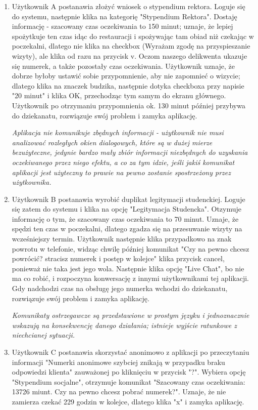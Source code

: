 \documentclass[12pt]{article}
\begin{document}
\begin {enumerate}
	\item Użytkownik A postanawia złożyć wniosek o stypendium rektora. Loguje się do systemu, następnie klika na kategorię "Stypendium Rektora". Dostaję informację - szacowany czas oczekiwania to 150 minut; uznaje, że lepiej spożytkuje ten czas idąc do restauracji i spożywając tam obiad niż czekając w poczekalni, dlatego nie klika na checkbox (Wyrażam zgodę na przyspieszanie wizyty), ale klika od razu na przycisk v. Oczom naszego delikwenta ukazuje się numerek, a także pozostały czas oczekiwania. Użytkownik uznaje, że dobrze byłoby ustawić sobie przypomnienie, aby nie zapomnieć o wizycie; dlatego klika na znaczek budzika, następnie dotyka checkboxa przy napisie "20 minut" i klika OK, przechodząc tym samym do ekranu głównego. Użytkownik po otrzymaniu przypomnienia ok. 130 minut później przybywa do dziekanatu, rozwiązuje swój problem i zamyka aplikację.
	
	\textit{Aplikacja nie komunikuje zbędnych informacji - użytkownik nie musi analizować rozległych okien dialogowych, które są w dużej mierze bezużyteczne, jedynie bardzo mały zbiór informacji niezbędnych do uzyskania oczekiwanego przez niego efektu, a co za tym idzie, jeśli jakiś komunikat aplikacji jest użyteczny to prawie na pewno zostanie spostrzeżony przez użytkownika.}\\
	
	
	\item Użytkownik B postanawia wyrobić duplikat legitymacji studenckiej. Loguje się zatem do systemu i klika na opcję "Legitymacja Studencka". Otzymuje informację o tym, że szacowany czas oczekiwania to 70 minut. Uznaje, że spędzi ten czas w poczekalni, dlatego zgadza się na przesuwanie wizyty na wcześniejszy termin. Użytkownik następnie klika przypadkowo na znak powrotu w telefonie, widząc chwilę później komunikat "Czy na pewno chcesz powrócić? stracisz numerek i postęp w kolejce" klika przycisk cancel, ponieważ nie taka jest jego wola. Następnie klika opcję "Live Chat", bo nie ma co robić, i rozpoczyna konwersację z innymi użytkownikami tej aplikacji. Gdy nadchodzi czas na obsługę jego numerka wchodzi do dziekanatu, rozwiązuje swój problem i zamyka aplikację.
	
	\textit{Komunikaty ostrzegawcze są przedstawione w prostym języku i jednoznacznie wskazują na konsekwencję danego działania; istnieje wyjście ratunkowe z niechcianej sytuacji.}\\
	
	\item Użytkownik C postanawia skorzystać anonimowo z aplikacji po przeczytaniu informacji "Numerki anonimowe szybciej znikają w przypadku braku odpowiedzi klienta" zauważonej po kliknięciu w przycisk "?". Wybiera opcję "Stypendium socjalne", otrzymuje komunikat "Szacowany czas oczekiwania: 13726 miunt. Czy na pewno chcesz pobrać numerek?". Uznaje, że nie zamierza czekać 229 godzin w kolejce, dlatego klika "x" i zamyka aplikację.
	

\end{enumerate}
\end{document}
